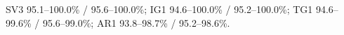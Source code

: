 SV3 95.1--100.0\% / 95.6--100.0\%; IG1 94.6--100.0\% / 95.2--100.0\%; TG1 94.6--99.6\% / 95.6--99.0\%; AR1 93.8--98.7\% / 95.2--98.6\%.
